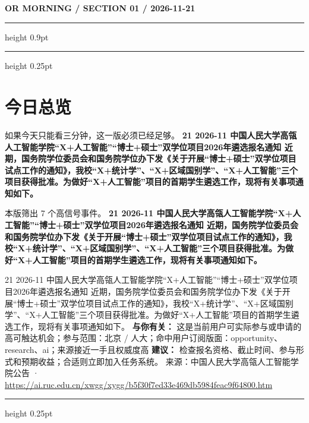 \documentclass[10.5pt]{ctexart}
\begin{document}
{\small\bfseries OR MORNING / SECTION 01 / 2026-11-21}
\vspace{2mm}
\hrule height 0.9pt
\vspace{1.5mm}
\hrule height 0.25pt
\vspace{4mm}
\section*{今日总览}
{\color{ormuted} 如果今天只能看三分钟，这一版必须已经足够。}
\vspace{2mm}
{\fontsize{25}{29}\selectfont\bfseries 21 2026-11 中国人民大学高瓴人工智能学院“X+人工智能”“博士+硕士”双学位项目2026年遴选报名通知 近期，国务院学位委员会和国务院学位办下发《关于开展“博士+硕士”双学位项目试点工作的通知》，我校“X+统计学”、“X+区域国别学”、“X+人工智能”三个项目获得批准。为做好“X+人工智能”项目的首期学生遴选工作，现将有关事项通知如下。}\par
\vspace{2mm}
{\large 本版筛出 7 个高信号事件。}
\vspace{3mm}
{\Large\bfseries 21 2026-11 中国人民大学高瓴人工智能学院“X+人工智能”“博士+硕士”双学位项目2026年遴选报名通知 近期，国务院学位委员会和国务院学位办下发《关于开展“博士+硕士”双学位项目试点工作的通知》，我校“X+统计学”、“X+区域国别学”、“X+人工智能”三个项目获得批准。为做好“X+人工智能”项目的首期学生遴选工作，现将有关事项通知如下。}\par
21 2026-11 中国人民大学高瓴人工智能学院“X+人工智能”“博士+硕士”双学位项目2026年遴选报名通知 近期，国务院学位委员会和国务院学位办下发《关于开展“博士+硕士”双学位项目试点工作的通知》，我校“X+统计学”、“X+区域国别学”、“X+人工智能”三个项目获得批准。为做好“X+人工智能”项目的首期学生遴选工作，现将有关事项通知如下。
\textbf{与你有关：} 这是当前用户可实际参与或申请的高可触达机会；参与范围：北京 / 人大；命中用户订阅版面：opportunity、research、ai；来源接近一手且权威度高
\textbf{建议：} 检查报名资格、截止时间、参与形式和预期收益；合适则立即加入任务系统。
{\footnotesize\color{ormuted} 来源：中国人民大学高瓴人工智能学院公告 · \url{https://ai.ruc.edu.cn/xwgg/xygg/b5f30f7ed33e469db5984feac9f64800.htm}}
\vspace{3mm}
\hrule height 0.25pt
\vspace{3mm}
\end{document}
